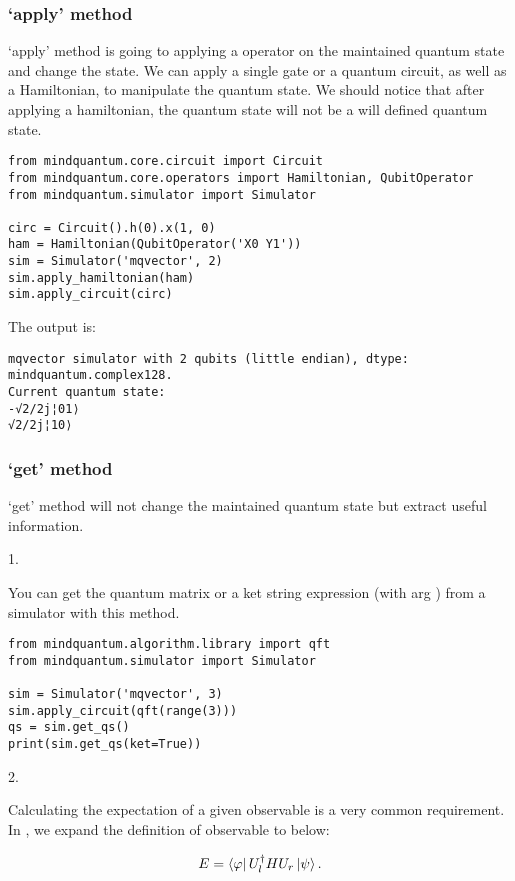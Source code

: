 \subsubsection{`apply' method}

`apply' method is going to applying a operator on the maintained quantum state and change the state. We can apply a single gate or a quantum circuit, as well as a Hamiltonian, to manipulate the quantum state. We should notice that after applying a hamiltonian, the quantum state will not be a will defined quantum state.

\begin{lstlisting}
from mindquantum.core.circuit import Circuit
from mindquantum.core.operators import Hamiltonian, QubitOperator
from mindquantum.simulator import Simulator

circ = Circuit().h(0).x(1, 0)
ham = Hamiltonian(QubitOperator('X0 Y1'))
sim = Simulator('mqvector', 2)
sim.apply_hamiltonian(ham)
sim.apply_circuit(circ)
\end{lstlisting}
The output is:
\begin{lstlisting}
mqvector simulator with 2 qubits (little endian), dtype: mindquantum.complex128.
Current quantum state:
-√2/2j¦01⟩
√2/2j¦10⟩
\end{lstlisting}

\subsubsection{`get' method}

`get' method will not change the maintained quantum state but extract useful information.

1. \getqs

You can get the quantum matrix or a ket string expression (with arg ) from a simulator with this method.
\begin{lstlisting}
from mindquantum.algorithm.library import qft
from mindquantum.simulator import Simulator

sim = Simulator('mqvector', 3)
sim.apply_circuit(qft(range(3)))
qs = sim.get_qs()
print(sim.get_qs(ket=True))
\end{lstlisting}

2. \getexpectation

Calculating the expectation of a given observable is a very common requirement. In \MindQuantum, we expand the definition of observable to below:

\begin{equation}
    E = \bra{\varphi}U_l^\dagger H U_r \ket{\psi}.
\end{equation}

